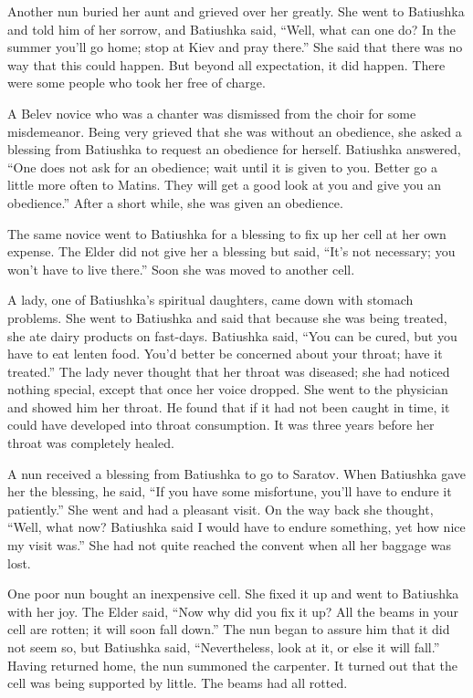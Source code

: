 Another nun buried her aunt and grieved over her greatly. She went to Batiushka and told him of her sorrow, and Batiushka said, ``Well, what can one do? In the summer you'll go home; stop at Kiev and pray there.'' She said that there was no way that this could happen. But beyond all expectation, it did happen. There were some people who took her free of charge.

A Belev novice who was a chanter was dismissed from the choir for some misdemeanor. Being very grieved that she was without an obedience, she asked a blessing from Batiushka to request an obedience for herself. Batiushka answered, ``One does not ask for an obedience; wait until it is given to you. Better go a little more often to Matins. They will get a good look at you and give you an obedience.'' After a short while, she was given an obedience.

The same novice went to Batiushka for a blessing to fix up her cell at her own expense. The Elder did not give her a blessing but said, ``It's not necessary; you won't have to live there.'' Soon she was moved to another cell.

A lady, one of Batiushka's spiritual daughters, came down with stomach problems. She went to Batiushka and said that because she was being treated, she ate dairy products on fast-days. Batiushka said, ``You can be cured, but you have to eat lenten food. You'd better be concerned about your throat; have it treated.'' The lady never thought that her throat was diseased; she had noticed nothing special, except that once her voice dropped. She went to the physician and showed him her throat. He found that if it had not been caught in time, it could have developed into throat consumption. It was three years before her throat was completely healed.

A nun received a blessing from Batiushka to go to Saratov. When Batiushka gave her the blessing, he said, ``If you have some misfortune, you'll have to endure it patiently.'' She went and had a pleasant visit. On the way back she thought, ``Well, what now? Batiushka said I would have to endure something, yet how nice my visit was.'' She had not quite reached the convent when all her baggage was lost.

One poor nun bought an inexpensive cell. She fixed it up and went to Batiushka with her joy. The Elder said, ``Now why did you fix it up? All the beams in your cell are rotten; it will soon fall down.'' The nun began to assure him that it did not seem so, but Batiushka said, ``Nevertheless, look at it, or else it will fall.'' Having returned home, the nun summoned the carpenter. It turned out that the cell was being supported by little. The beams had all rotted.

